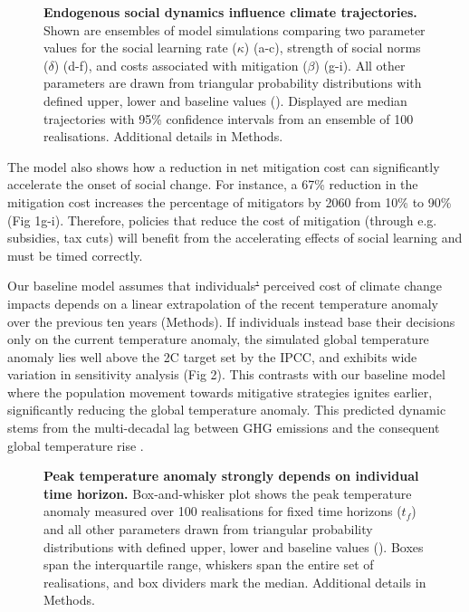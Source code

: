 \documentclass[10pt,letterpaper]{article}
\providecommand{\DIFaddtex}[1]{{\protect\color{blue}\uwave{#1}}} %
\providecommand{\DIFdeltex}[1]{{\protect\color{red}\sout{#1}}}                      %
\providecommand{\DIFaddbegin}{} %
\providecommand{\DIFaddend}{} %
\providecommand{\DIFdelbegin}{} %
\providecommand{\DIFdelend}{} %
\providecommand{\DIFadd}[1]{\texorpdfstring{\DIFaddtex{#1}}{#1}} %
\providecommand{\DIFdel}[1]{\texorpdfstring{\DIFdeltex{#1}}{}} %
\begin{document}
\begin{figure}[!ht]
\caption{{\bf Endogenous social dynamics influence climate trajectories.}
Shown are
ensembles of model simulations comparing two parameter values for the social learning rate ($\kappa$) (a-c), strength of social norms ($\delta$) (d-f), and costs associated with mitigation ($\beta$)
(g-i). All other parameters are drawn from triangular probability distributions with defined upper, lower and baseline values (). Displayed are median trajectories with 95\% confidence intervals from an ensemble of 100 realisations. Additional details in Methods.}
\label{fig1}
\end{figure}


The model also shows how a reduction in net mitigation cost can significantly accelerate the onset of social change. For instance, a 67\% reduction in the mitigation cost increases the percentage of mitigators by 2060 from 10\% to 90\% (Fig 1g-i). Therefore, policies that reduce the cost of mitigation (through e.g. subsidies, tax cuts) will benefit from the accelerating effects of social learning and must be timed correctly. 

Our baseline model assumes that individuals\DIFdelbegin \DIFdel{’ }\DIFdelend \DIFaddbegin \DIFadd{? }\DIFaddend perceived cost of climate change impacts depends on a linear extrapolation of the recent temperature anomaly over the previous ten years (Methods). If individuals instead base their decisions only on the current temperature anomaly, the simulated global temperature anomaly lies well above the 2\degree C target set by the IPCC, and exhibits wide variation in sensitivity analysis (Fig 2). This contrasts with our baseline model where the population movement towards mitigative strategies ignites earlier, significantly reducing the global temperature anomaly. This predicted dynamic stems from the multi-decadal lag between GHG emissions and the consequent global temperature rise \cite{hansen05}.

\begin{figure}[!ht]
\caption{{\bf Peak temperature anomaly strongly depends on individual time horizon.}
Box-and-whisker plot shows the peak temperature anomaly measured over 100 realisations for fixed time horizons ($t_f$) and all other parameters drawn from triangular probability distributions with defined upper, lower and baseline values (). Boxes span the interquartile range, whiskers span the entire set of realisations, and box dividers mark the median. Additional details in Methods.}
\label{fig2}
\end{figure}
\end{document}
